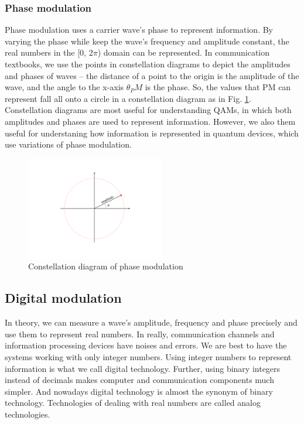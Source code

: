 \documentclass{book}
\begin{document}
\subsubsection{Phase modulation}
Phase modulation uses a carrier wave's phase to represent information. By varying the phase while keep the wave's frequency and amplitude constant, the real numbers in the [0, 2$\pi$) domain can be represented. In communication textbooks, we use the points in constellation diagrams to depict the amplitudes and phases of waves -- 
the distance of a point to the origin is the amplitude of the wave, and the angle to the x-axis $\theta_PM$ is the phase. 
So, the values that PM can represent fall all onto a circle in a constellation diagram as in Fig. \ref{PM}. Constellation diagrams are most useful for understanding QAMs, in which both amplitudes and phases are used to represent information. However, we also them useful for understaning how information is represented in quantum devices, which use variations of phase modulation.

\begin{figure}[ht]
\includegraphics[width=6cm]{pic/PM.pdf}
\caption{Constellation diagram of phase modulation}
\label{PM}
\end{figure}

\subsection{Digital modulation}
In theory, we can measure a wave's amplitude, frequency and phase precisely and use them to represent real numbers. In really, communication channels and information processing devices have noises and errors. We are best to have the systems working with only integer numbers. Using integer numbers to represent information is what we call digital technology. Further, using binary integers instead of decimals makes computer and communication components much simpler. And nowadays digital technology is almost the synonym of binary technology. Technologies of dealing with real numbers are called analog technologies.
\end{document}
